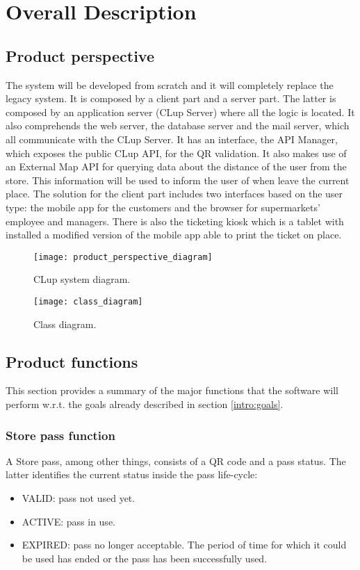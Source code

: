 \chapter{Overall Description}

\section{Product perspective}

The system will be developed from scratch and it will completely replace the legacy system. \newline
It is composed by a client part and a server part.
The latter is composed by an application server (CLup Server) where all the logic is located. It also comprehends the web server, the database server and the mail server,
which all communicate with the CLup Server.
It has an interface, the API Manager, which exposes the public CLup API, for the QR validation. It also makes use of an External Map API for querying data about the
distance of the user from the store. This information will be used to inform the user of when leave the current place.\newline
The solution for the client part includes two interfaces based on the user type: the mobile app for the customers and the browser for supermarkets' employee and managers.
There is also the ticketing kiosk which is a tablet with installed a modified version of the mobile app able to print the ticket on place.
\vspace{1em}
\begin{figure}[H]
	\centering
	\texttt{[image: product\_perspective\_diagram]}
	\caption{CLup system diagram.}
\end{figure}

\begin{figure}[H]
	\centering
	\texttt{[image: class\_diagram]}
	\caption{Class diagram.}
\end{figure}

\section{Product functions}\label{desc:prodFunc}
This section provides a summary of the major functions that the software will perform w.r.t. the goals already described in section \ref{intro:goals}.

\subsection{Store pass function}
	A Store pass, among other things, consists of a QR code and a pass status. The latter identifies the current status inside the pass life-cycle:
	\begin{itemize}
		\item VALID: pass not used yet.
		\item ACTIVE: pass in use.
		\item EXPIRED: pass no longer acceptable. The period of time for which it could be used has ended or the pass has been successfully used.
	\end{itemize}

